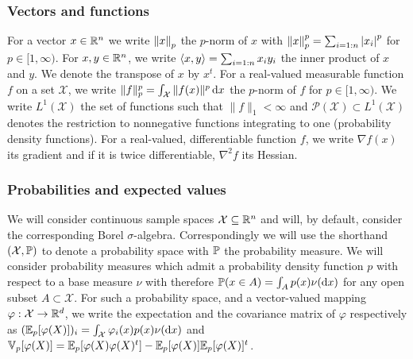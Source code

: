 \subsubsection{Vectors and functions}
For a vector $x\in\R^{n}$ we write $\norm{x}{p}$ the $p$-norm of $x$ with $\norm{x}{p}^{p}=\sum_{i=1:n}\abs{x_{i}}^{p}$ for $p\in[1,\infty)$. 
For $x,y\in\R^{n}$, we write $\scal{x,y}=\sum_{i=1:n}x_{i}y_{i}$ the inner product of $x$ and $y$. 
We denote the transpose of $x$ by $x^{t}$. 
For a real-valued measurable function $f$ on a set $\mathcal X$, we write $\|f\|_{p}^{p}=\int_{\mathcal X} \|f(x)\|^{p}\dx$ the $p$-norm of $f$ for $p\in[1,\infty)$. 
We write $L^{1}(\mathcal X)$ the set of functions such that $\|f\|_{1}<\infty$ and $\mathcal P(\mathcal X) \subset L^{1}(\mathcal X)$ denotes the restriction to nonnegative functions integrating to one (probability density functions). 
For a real-valued, differentiable function $f$, we write $\nabla f(x)$ its gradient and if it is twice differentiable, $\nabla^{2} f$ its Hessian.

\subsubsection{Probabilities and expected values}
We will consider continuous sample spaces $\mathcal X\subseteq \R^{n}$ and will, by default, consider the corresponding Borel $\sigma$-algebra. Correspondingly we will use the shorthand $(\mathcal X,\P)$ to denote a probability space with $\P$ the probability measure. We will consider probability measures which admit a probability density function $p$ with respect to a base measure $\nu$ with therefore $\P(x\in A)=\int_{A}p(x)\nudx$ for any open subset $A\subset \mathcal X$. For such a probability space, and a vector-valued mapping $\varphi:\mathcal X\to\R^{d}$, we write the expectation and the covariance matrix of $\varphi$ respectively as $(\E_{p}[\varphi(X)])_{i}=\int_{\mathcal X}\varphi_{i}(x)p(x)\nudx$ and $\V_{p}[\varphi(X)]=\E_{p}[\varphi(X)\varphi(X)^{t}]-\E_{p}[\varphi(X)]\E_{p}[\varphi(X)]^{t}$.

